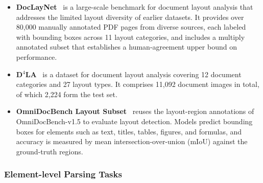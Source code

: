 \begin{itemize}[
  leftmargin=1.0em,
  labelsep=0.5em
]
    \item \textbf{DocLayNet}~\cite{pfitzmann2022doclaynet} is a large-scale benchmark for document layout analysis that addresses the limited layout diversity of earlier datasets. It provides over 80,000 manually annotated PDF pages from diverse sources, each labeled with bounding boxes across 11 layout categories, and includes a multiply annotated subset that establishes a human-agreement upper bound on performance.

    \item \textbf{D$^4$LA}~\cite{da2023vgt} is a dataset for document layout analysis covering 12 document categories and 27 layout types. It comprises 11,092 document images in total, of which 2,224 form the test set.

    \item \textbf{OmniDocBench Layout Subset}~\cite{ouyang2025omnidocbench} reuses the layout-region annotations of OmniDocBench-v1.5 to evaluate layout detection. Models predict bounding boxes for elements such as text, titles, tables, figures, and formulas, and accuracy is measured by mean intersection-over-union (mIoU) against the ground-truth regions.

\end{itemize}

\subsubsection*{Element-level Parsing Tasks}

